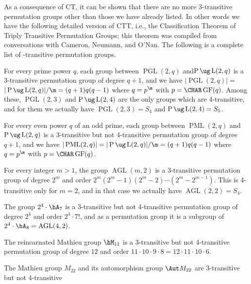 As a consequence of CT, it can be shown that there are no 
more 3-transitive
permutation groups other than those we have already 
listed. In other
words we have the following detailed version of CTT, i.e., 
the 
Classification Theorem of Triply Transitive Permutation 
Groups;
this theorem was compiled from conversations with Cameron, 
Neumann,
and O'Nan.
The 
following is a complete list of -transitive 
permutation groups.
\roster
\item
For every prime power $q$, each group between 
$\operatorname{PGL}(2,q)$ and$\operatorname{P}
\ug\operatorname{L}(2,q)$ is a {\rm3}-transitive permutation
group of degree $q+1$, and we have 
$|\operatorname{PGL}(2,q)|=$ %
$|\operatorname{P}\ug \operatorname{L}(2,q)|/\m=(q+1)q(q-1)$
where $q=p^{\m}$ with $p=\CHAR \operatorname{GF}(q)$.
Among these, $\operatorname{PGL}(2,3)$ and 
$\operatorname{P}\ug 
\operatorname{L}(2,4)$ are the only groups which are
{\rm4}-transitive, and for them we actually have 
$\operatorname{PGL}(2,3)=S_4$ and
$\operatorname{P}\ug \operatorname{L}(2,4)=S_5$.
\item
For every even power $q$ of an odd prime, each group 
between $\operatorname{PML}
(2,q)$ and
$\operatorname{P}\ug \operatorname{L}(2,q)$ is a  
{\rm3}-transitive but not
{\rm4}-transitive permutation
group of degree $q+1$, and we have 
$|\operatorname{PML}(2,q)|=|\operatorname{P}
\ug \operatorname{L}(2,q)|/\m= (q+1)q(q-1)$
where $q=p^{\m}$ with $p=\CHAR \operatorname{GF}(q)$.
\item
For every integer $m>1$, the group 
$\operatorname{AGL}(m,2)$ is a 
{\rm3}-transitive 
permutation group of degree $2^m$ and order 
$2^m(2^m-1)(2^m-2)\dotsb(2^m-2^{m-1})$.
This is {\rm4}-transitive only for $m=2$, and in that case 
we actually have
$\operatorname{AGL}(2,2)=S_4$.
\item
The group $2^4\cdot\hA_7$ is a {\rm3}-transitive but not 
{\rm4}-transitive permutation 
group of degree $2^4$ and order $2^4\cdot 7!$, and as a 
permutation group it is a subgroup of 
$2^4\cdot\hA_8=\operatorname{AGL}(4,2)$.
\item
The reincarnated Mathieu group $\hM_{11}$ is a 
{\rm3}-transitive but not
{\rm4}-transitive permutation group of degree $12$ and 
order 
$11\cdot 10\cdot 9\cdot 8=12\cdot 11\cdot 10\cdot 6$.
\item
The Mathieu group $M_{22}$ and its automorphism group 
$\Aut M_{22}$
are {\rm3}-transitive but not {\rm4}-transitive 
